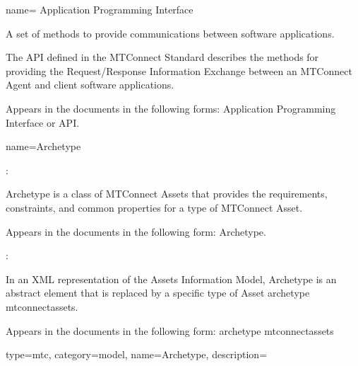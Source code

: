 {
  name= {Application Programming Interface}
}
{
  A set of methods to provide communications between software applications.

  The API defined in the MTConnect Standard describes the methods for providing the Request/Response Information Exchange between an MTConnect Agent and client software applications.
  
  Appears in the documents in the following forms: Application Programming Interface or API.
}


{
  name={Archetype}
}
{
  :
  
  Archetype is a class of MTConnect Assets that provides the requirements, constraints, and common properties for a type of MTConnect Asset.

  Appears in the documents in the following form: Archetype.

  :
  
  In an XML representation of the Assets Information Model, Archetype is an abstract element that is replaced by a specific type of Asset \gls{archetype mtconnectassets}. 
  
  Appears in the documents in the following form: \gls{archetype mtconnectassets}
}


{
  type=mtc,
  category=model,
  name={Archetype},
  description={}
}

